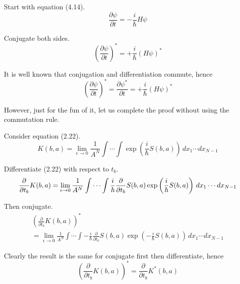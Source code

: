 


Start with equation (4.14).
\begin{equation*}
\frac{\partial\psi}{\partial t}=-\frac{i}{\hbar}H\psi
\tag{4.14}
\end{equation*}

Conjugate both sides.
\begin{equation*}
\left(\frac{\partial\psi}{\partial t}\right)^*=+\frac{i}{\hbar}(H\psi)^*
\end{equation*}

It is well known that conjugation and differentiation commute, hence
\begin{equation*}
\left(\frac{\partial\psi}{\partial t}\right)^*=\frac{\partial\psi^*}{\partial t}=+\frac{i}{\hbar}(H\psi)^*
\end{equation*}

However, just for the fun of it, let us complete the proof without using the commutation rule.

\bigskip
Consider equation (2.22).
\begin{equation*}
K(b,a)=\lim_{\epsilon\rightarrow0}\frac{1}{A^N}\int\cdots\int
\exp\left(\frac{i}{\hbar}S(b,a)\right)\,dx_1\cdots dx_{N-1}
\tag{2.22}
\end{equation*}

Differentiate (2.22) with respect to $t_b$.
\begin{equation*}
\frac{\partial}{\partial t_b}K(b,a)
\\
=
\lim_{\epsilon\rightarrow0}\frac{1}{A^N}
\int\cdots\int
\frac{i}{\hbar}\frac{\partial}{\partial t_b}S(b,a)
\exp\left(\frac{i}{\hbar}S(b,a)\right)\,dx_1\cdots dx_{N-1}
\end{equation*}

Then conjugate.
\begin{multline*}
\left(\frac{\partial}{\partial t_b}K(b,a)\right)^*
\\
{}=\lim_{\epsilon\rightarrow0}\frac{1}{A^N}
\int\cdots\int
-\frac{i}{\hbar}\frac{\partial}{\partial t_b}S(b,a)
\exp\left(-\frac{i}{\hbar}S(b,a)\right)\,dx_1\cdots dx_{N-1}
\end{multline*}

Clearly the result is the same for conjugate first then differentiate, hence
\begin{equation*}
\left(\frac{\partial}{\partial t_b}K(b,a)\right)^*
=\frac{\partial}{\partial t_b}K^*(b,a)
\tag{1}
\end{equation*}

